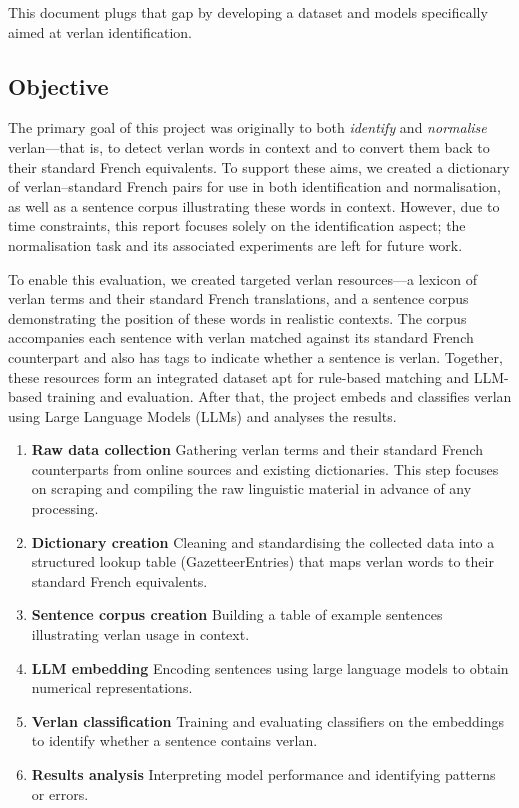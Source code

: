 \documentclass[12pt]{article}
\begin{document}
This document plugs that gap by developing a dataset and models specifically aimed at verlan identification.

\subsection{Objective}

The primary goal of this project was originally to both \textit{identify} and \textit{normalise} verlan\;---\;that is, to detect verlan words in context and to convert them back to their standard French equivalents. To support these aims, we created a dictionary of verlan--standard French pairs for use in both identification and normalisation, as well as a sentence corpus illustrating these words in context. However, due to time constraints, this report focuses solely on the identification aspect; the normalisation task and its associated experiments are left for future work.

To enable this evaluation, we created targeted verlan resources\;---\;a lexicon of verlan terms and their standard French translations, and a sentence corpus demonstrating the position of these words in realistic contexts. The corpus accompanies each sentence with verlan matched against its standard French counterpart and also has tags to indicate whether a sentence is verlan. Together, these resources form an integrated dataset apt for rule-based matching and LLM-based training and evaluation. After that, the project embeds and classifies verlan using Large Language Models (LLMs) and analyses the results.

\begin{enumerate}
  \item \textbf{Raw data collection} Gathering verlan terms and their standard French counterparts from online sources and existing dictionaries. This step focuses on scraping and compiling the raw linguistic material in advance of any processing.
  \item \textbf{Dictionary creation} Cleaning and standardising the collected data into a structured lookup table (GazetteerEntries) that maps verlan words to their standard French equivalents.
  \item \textbf{Sentence corpus creation} Building a table of example sentences illustrating verlan usage in context.
  \item \textbf{LLM embedding} Encoding sentences using large language models to obtain numerical representations.
  \item \textbf{Verlan classification} Training and evaluating classifiers on the embeddings to identify whether a sentence contains verlan.
  \item \textbf{Results analysis} Interpreting model performance and identifying patterns or errors.
\end{enumerate}
\end{document}
